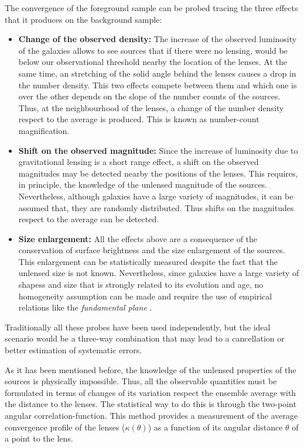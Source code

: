 The convergence of the foreground sample can be probed tracing the three effects that it produces on the background sample:
\begin{itemize}
\item {\bf Change of the observed density:} The increase of the observed luminosity of the galaxies allows to see sources that if there were no lensing, would be below our observational threshold nearby the location of the lenses. At the same time, an stretching of the solid angle behind the lenses causes a drop in the number density. This two effects compete between them and which one is over the other depends on the slope of the number counts of the sources. Thus, at the neighbourhood of the lenses, a change of the number density respect to the average is produced. This is known as number-count magnification.
\item {\bf Shift on the observed magnitude:} Since the increase of luminosity due to gravitational lensing is a short range effect, a shift on the observed magnitudes may be detected nearby the positions of the lenses. This requires, in principle, the knowledge of the unlensed magnitude of the sources. Nevertheless, although galaxies have a large variety of magnitudes, it can be assumed that, they are randomly distributed. Thus shifts on the magnitudes respect to the average can be detected.
\item {\bf Size enlargement:} All the effects above are a consequence of the conservation of surface brightness and the size enlargement of the sources. This enlargement can be statistically measured despite the fact that the unlensed size is not known. Nevertheless, since galaxies have a large variety of shapess and size that is strongly related to its evolution and age, no homogeneity assumption can be made and require the use of empirical relations like the {\it fundamental plane} \cite{2003AJ....125.1866B,2041-8205-780-2-L16}.
\end{itemize}

Traditionally all these probes have been used independently, but the ideal scenario would be a three-way combination that may lead to a cancellation or better estimation of systematic errors.
\newline

As it has been mentioned before, the knowledge of the unlensed properties of the sources is physically impossible. Thus, all the observable quantities must be formulated in terms of changes of its variation respect the ensemble average with the distance to the lenses. The statistical way to do this is through the two-point angular correlation-function. This method provides a measurement of the average convergence profile of the lenses ($\kappa(\theta)$) as a function of its angular distance $\theta$ of a point to the lens.


